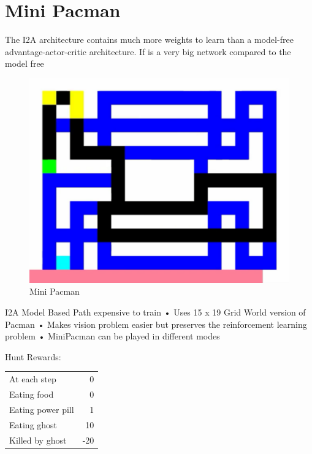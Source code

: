 \section{Mini Pacman}


The I2A architecture contains much more weights to learn than a model-free advantage-actor-critic architecture. If  is a very big network compared to the model free 

\begin{figure}[H] 
  \centering   
  \includegraphics[width=0.5\columnwidth]{./Images/mini_pacman.png}
  \caption{Mini Pacman} 
  \label{fig:environment_model_architecture} 
\end{figure} 


I2A Model Based Path expensive to train
• Uses 15 x 19 Grid World version of Pacman
• Makes vision problem easier but preserves the reinforcement
learning problem
•
MiniPacman can be played in different modes



Hunt Rewards:\\

\begin{center}
	\begin{tabular}{ p{4cm}  r }
 	At each step & 0 \\
  	Eating food & 0 \\
	Eating power pill & 1\\
	Eating ghost & 10\\
	Killed by ghost & -20\\
	\end{tabular}
\end{center}